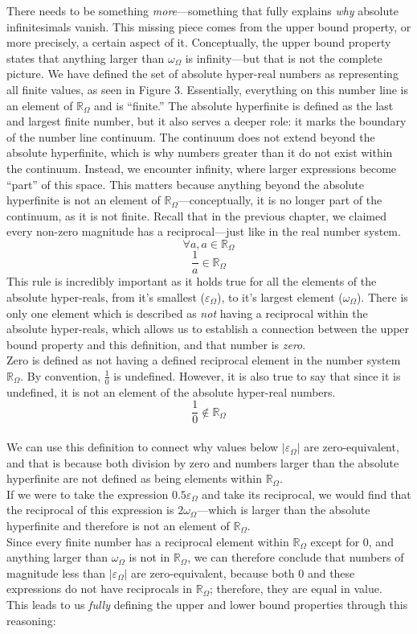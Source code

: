 \documentclass{article}
\begin{document}
There needs to be something \textit{more}---something that fully explains \textit{why} absolute infinitesimals vanish. This missing piece comes from the upper bound property, or more precisely, a certain aspect of it. Conceptually, the upper bound property states that anything larger than $\omega_\Omega$ is infinity---but that is not the complete picture. We have defined the set of absolute hyper-real numbers as representing all finite values, as seen in Figure 3. Essentially, everything on this number line is an element of $\mathbb{R}_\Omega$ and is ``finite.'' The absolute hyperfinite is defined as the last and largest finite number, but it also serves a deeper role: it marks the boundary of the number line continuum. The continuum does not extend beyond the absolute hyperfinite, which is why numbers greater than it do not exist within the continuum. Instead, we encounter infinity, where larger expressions become ``part'' of this space. This matters because anything beyond the absolute hyperfinite is not an element of $\mathbb{R}_\Omega$---conceptually, it is no longer part of the continuum, as it is not finite. Recall that in the previous chapter, we claimed every non-zero magnitude has a reciprocal---just like in the real number system.$$\forall a, a \in \mathbb{R}_\Omega$$ $$\frac{1}{a} \in \mathbb{R}_\Omega$$This rule is incredibly important as it holds true for all the elements of the absolute hyper-reals, from it's smallest ($\varepsilon_\Omega$), to it's largest element ($\omega_\Omega$). There is only one element which is described as \textit{not} having a reciprocal within the absolute hyper-reals, which allows us to establish a connection between the upper bound property and this definition, and that number is \textit{zero}.\\Zero is defined as not having a defined reciprocal element in the number system $\mathbb{R}_\Omega$. By convention, $\frac{1}{0}$ is undefined. However, it is also true to say that since it is undefined, it is not an element of the absolute hyper-real numbers.
$$\frac{1}{0} \notin \mathbb{R}_\Omega$$
\\We can use this definition to connect why values below $|\varepsilon_\Omega|$ are zero-equivalent, and that is because both division by zero and numbers larger than the absolute hyperfinite are not defined as being elements within $\mathbb{R}_\Omega$.\\If we were to take the expression $0.5\varepsilon_\Omega$ and take its reciprocal, we would find that the reciprocal of this expression is $2\omega_\Omega$---which is larger than the absolute hyperfinite and therefore is not an element of $\mathbb{R}_\Omega$.\\Since every finite number has a reciprocal element within $\mathbb{R}_\Omega$ except for $0$, and anything larger than $\omega_\Omega$ is not in $\mathbb{R}_\Omega$, we can therefore conclude that numbers of magnitude less than $|\varepsilon_\Omega|$ are zero-equivalent, because both $0$ and these expressions do not have reciprocals in $\mathbb{R}_\Omega$; therefore, they are equal in value.\\This leads to us \textit{fully} defining the upper and lower bound properties through this reasoning:
\end{document}
